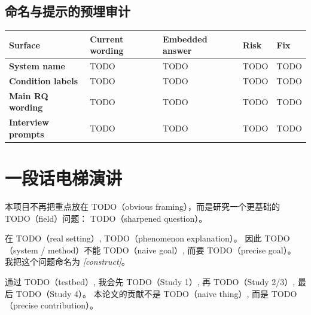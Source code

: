 \subsection{命名与提示的预埋审计}

\begin{center}
\small
\begin{tabularx}{\textwidth}{>{\bfseries}p{}p{}p{}p{}X}
\toprule
Surface & Current wording & Embedded answer & Risk & Fix \\
\midrule
System name & TODO & TODO & TODO & TODO \\
Condition labels & TODO & TODO & TODO & TODO \\
Main RQ wording & TODO & TODO & TODO & TODO \\
Interview prompts & TODO & TODO & TODO & TODO \\
\bottomrule
\end{tabularx}
\end{center}


\section{一段话电梯演讲}

\begin{thesisbox}
本项目不再把重点放在 TODO（obvious framing），而是研究一个更基础的 TODO（field）问题：
TODO（sharpened question）。

在 TODO（real setting）, TODO（phenomenon explanation）。
因此 TODO（system / method）不能 TODO（naive goal）, 而要 TODO（precise goal）。
我把这个问题命名为 \textit{[construct]}。

通过 TODO（testbed）, 我会先 TODO（Study 1）, 再 TODO（Study 2/3）, 最后 TODO（Study 4）。
本论文的贡献不是 TODO（naive thing）, 而是 TODO（precise contribution）。
\end{thesisbox}
